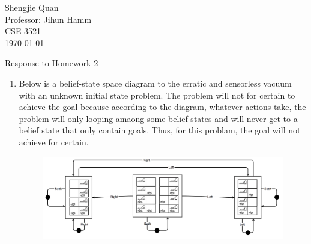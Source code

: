 \documentclass[12pt]{article}
\title{}
\author{}
\date{}                                           %
\begin{document}
\begin{flushleft}
Shengjie Quan\\
Professor: Jihun Hamm\\
CSE 3521	 \\
\today \\
\end{flushleft}

\begin{center}
Response to Homework 2
\end{center}

\setlength{\parindent}{0.5in}

\begin{singlespace}

\begin{enumerate}

\item 
	Below is a belief-state space diagram to the erratic and sensorless vacuum with an unknown initial state problem. The problem will not for certain to achieve the goal because according to the diagram, whatever actions take, the problem will only looping amaong some belief states and will never get to a belief state that only contain goals. Thus, for this problam, the goal will not achieve for certain.
	\begin{figure}[h]
	\centering
	\includegraphics[width=1.1\textwidth]{b} 
	\end{figure}


\end{enumerate}
\end{singlespace}
\end{document}
